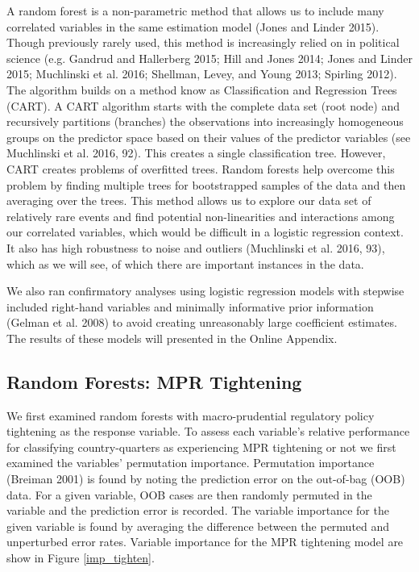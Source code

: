 \documentclass[]{article}
\begin{document}
A random forest is a non-parametric method that allows us to include
many correlated variables in the same estimation model (Jones and Linder
2015). Though previously rarely used, this method is increasingly relied
on in political science (e.g. Gandrud and Hallerberg 2015; Hill and
Jones 2014; Jones and Linder 2015; Muchlinski et al. 2016; Shellman,
Levey, and Young 2013; Spirling 2012). The algorithm builds on a method
know as Classification and Regression Trees (CART). A CART algorithm
starts with the complete data set (root node) and recursively partitions
(branches) the observations into increasingly homogeneous groups on the
predictor space based on their values of the predictor variables (see
Muchlinski et al. 2016, 92). This creates a single classification tree.
However, CART creates problems of overfitted trees. Random forests help
overcome this problem by finding multiple trees for bootstrapped samples
of the data and then averaging over the trees. This method allows us to
explore our data set of relatively rare events and find potential
non-linearities and interactions among our correlated variables, which
would be difficult in a logistic regression context. It also has high
robustness to noise and outliers (Muchlinski et al. 2016, 93), which as
we will see, of which there are important instances in the data.

We also ran confirmatory analyses using logistic regression models with
stepwise included right-hand variables and minimally informative prior
information (Gelman et al. 2008) to avoid creating unreasonably large
coefficient estimates. The results of these models will presented in the
Online Appendix.

\subsection{Random Forests: MPR
Tightening}\label{random-forests-mpr-tightening}

We first examined random forests with macro-prudential regulatory policy
tightening as the response variable. To assess each variable's relative
performance for classifying country-quarters as experiencing MPR
tightening or not we first examined the variables' permutation
importance. Permutation importance (Breiman 2001) is found by noting the
prediction error on the out-of-bag (OOB) data. For a given variable, OOB
cases are then randomly permuted in the variable and the prediction
error is recorded. The variable importance for the given variable is
found by averaging the difference between the permuted and unperturbed
error rates. Variable importance for the MPR tightening model are show
in Figure \ref{imp_tighten}.
\end{document}

